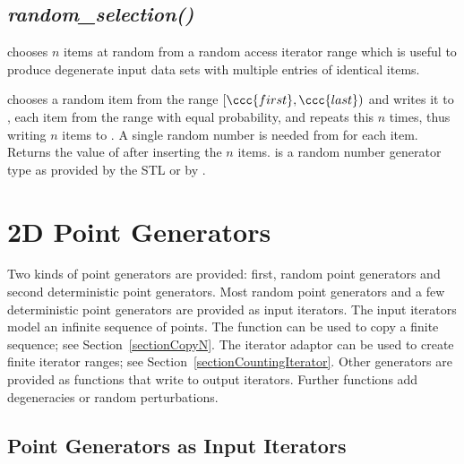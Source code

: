 \subsection{{\it random\_selection()}}
\label{sectionRandomSelection}

 chooses $n$ items at random from a random
access iterator range which is useful to produce degenerate input data
sets with multiple entries of identical items.


{ chooses a random item from the range $[\ccc{first},\ccc{last})$ and
    writes it to , each item from the range with equal
    probability, and repeats this $n$ times, thus writing $n$ items to
    .
    A single random number is needed from  for each item.
    Returns the value of  after inserting the $n$ items.
    \ccPrecond {} is a random number generator type as provided 
    by the STL or by .
}


\section{2D Point Generators}
\label{sectionPointGenerators_2}

Two kinds of point generators are provided: first, random point
generators and second deterministic point generators. Most random
point generators and a few deterministic point generators are provided
as input iterators.  The input iterators model an infinite sequence of
points. The function  can be used to copy a
finite sequence; see Section~\ref{sectionCopyN}. The iterator adaptor
 can be used to create finite iterator
ranges; see Section~\ref{sectionCountingIterator}.
Other generators are provided as functions that write to output
iterators. Further functions add degeneracies or random perturbations.


\subsection{Point Generators as Input Iterators}

